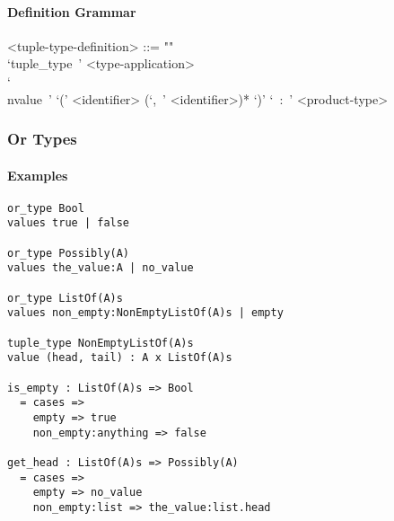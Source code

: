 \documentclass{article}
\begin{document}
\paragraph{Definition Grammar}
\begin{grammar}
<tuple-type-definition> ::= ""\\
`tuple_type\ ' <type-application>
\\`\\nvalue\ ' `(' <identifier> (`,\ ' <identifier>)* `)' `\ :\ ' <product-type>
\end{grammar}

\subsubsection{Or Types}

\paragraph{Examples}

\begin{verbatim}
or_type Bool
values true | false

or_type Possibly(A)
values the_value:A | no_value

or_type ListOf(A)s
values non_empty:NonEmptyListOf(A)s | empty

tuple_type NonEmptyListOf(A)s
value (head, tail) : A x ListOf(A)s

is_empty : ListOf(A)s => Bool
  = cases => 
    empty => true
    non_empty:anything => false

get_head : ListOf(A)s => Possibly(A)
  = cases => 
    empty => no_value
    non_empty:list => the_value:list.head
\end{verbatim}
\end{document}
